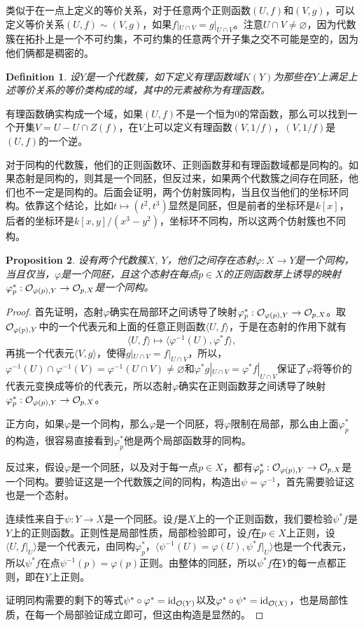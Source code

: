 \documentclass[9pt]{extbook}
\theoremstyle{plain}%
\newtheorem{defi}{Definition}[section]%
\newtheorem{pro}[defi]{Proposition}%
\begin{document}
类似于在一点上定义的等价关系，对于任意两个正则函数$(U,f)$和$(V,g)$，可以定义等价关系$(U,f)\sim(V,g)$，如果$f|_{U\cap V}=g|_{U\cap V}$。注意$U\cap V\neq \varnothing$，因为代数簇在拓扑上是一个不可约集，不可约集的任意两个开子集之交不可能是空的，因为他们俩都是稠密的。
\begin{defi}
	设$Y$是一个代数簇，如下定义有理函数域$K(Y)$为那些在$Y$上满足上述等价关系的等价类构成的域，其中的元素被称为有理函数。
\end{defi}
有理函数确实构成一个域，如果$(U,f)$不是一个恒为0的常函数，那么可以找到一个开集$V=U-U\cap Z(f)$，在$V$上可以定义有理函数$(V,1/f)$，$(V,1/f)$是$(U,f)$的一个逆。

对于同构的代数簇，他们的正则函数环、正则函数芽和有理函数域都是同构的。如果态射是同构的，则其是一个同胚，但反过来，如果两个代数簇之间存在同胚，他们也不一定是同构的。后面会证明，两个仿射簇同构，当且仅当他们的坐标环同构。依靠这个结论，比如$t\mapsto (t^2,t^3)$显然是同胚，但是前者的坐标环是$k[x]$，后者的坐标环是$k[x,y]/(x^3-y^2)$，坐标环不同构，所以这两个仿射簇也不同构。

\begin{pro}
	设有两个代数簇$X$, $Y$，他们之间存在态射$\varphi:X\to Y$是一个同构，当且仅当，$\varphi$是一个同胚，且这个态射在每点$p\in X$的正则函数芽上诱导的映射$\varphi^*_p:\mathcal{O}_{\varphi(p),Y}\to \mathcal{O}_{p,X}$是一个同构。
	\label{c3:p3}
\end{pro}
\begin{proof}
	首先证明，态射$\varphi$确实在局部环之间诱导了映射$\varphi^*_p:\mathcal{O}_{\varphi(p),Y}\to \mathcal{O}_{p,X}$。取$\mathcal{O}_{\varphi(p),Y}$中的一个代表元和上面的任意正则函数$\langle U,f\rangle$，于是在态射的作用下就有
	\[
		\langle U,f\rangle\mapsto \langle \varphi^{-1}(U),\varphi^*f\rangle,
	\]
	再挑一个代表元$\langle V,g\rangle$，使得$g|_{U\cap V}=f|_{U\cap V}$，所以，$\varphi^{-1}(U)\cap \varphi^{-1}(V)=\varphi^{-1}(U\cap  V)\neq \varnothing$和$\varphi^*g|_{U\cap V}=\varphi^*f|_{U\cap V}$保证了$\varphi$将等价的代表元变换成等价的代表元，所以态射$\varphi$确实在正则函数芽之间诱导了映射$\varphi^*_p:\mathcal{O}_{\varphi(p),Y}\to \mathcal{O}_{p,X}$。

	正方向，如果$\varphi$是一个同构，那么$\varphi$是一个同胚，将$\varphi$限制在局部，那么由上面$\varphi^*_p$的构造，很容易直接看到$\varphi^*_p$他是两个局部函数芽的同构。

	反过来，假设$\varphi$是一个同胚，以及对于每一点$p\in X$，都有$\varphi^*_p:\mathcal{O}_{\varphi(p),Y}\to \mathcal{O}_{p,X}$是一个同构。要验证这是一个代数簇之间的同构，构造出$\psi=\varphi^{-1}$，首先需要验证这也是一个态射。

	连续性来自于$\psi:Y\to X$是一个同胚。设$f$是$X$上的一个正则函数，我们要检验$\psi^* f$是$Y$上的正则函数。正则性是局部性质，局部检验即可，设$f$在$p\in X$上正则，设$\langle U,f|_U\rangle$是一个代表元，由同构$\varphi^*_p$，$\langle \psi^{-1}(U)=\varphi(U),\psi^* f|_U\rangle$也是一个代表元，所以$\psi^* f$在点$\psi^{-1}(p)=\varphi(p)$正则。由整体的同胚，所以$\psi^* f$在$Y$的每一点都正则，即在$Y$上正则。

	证明同构需要的剩下的等式$\psi^*\circ \varphi^*=\operatorname{id}_{\mathcal{O}(Y)}$以及$\varphi^*\circ\psi^* =\operatorname{id}_{\mathcal{O}(X)}$，也是局部性质，在每一个局部验证成立即可，但这由构造是显然的。
\end{proof}
\end{document}
